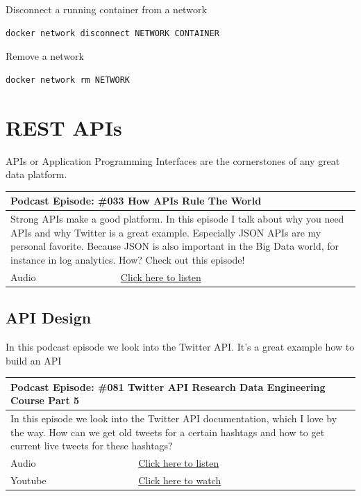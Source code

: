 \documentclass[12pt, numbers=noenddot]{scrreprt} %
\begin{document}
Disconnect a running container from a network
\begin{lstlisting}
docker network disconnect NETWORK CONTAINER
\end{lstlisting}

Remove  a network
\begin{lstlisting}
docker network rm NETWORK
\end{lstlisting}


\chapter{REST APIs}
APIs or Application Programming Interfaces are the cornerstones of any great data platform.

\begin{table}[h]
\begin{tabular}{ll}
\hline
\multicolumn{2}{l}{\textbf{Podcast Episode:} \#033 How APIs Rule The World} \\ \hline
\multicolumn{2}{p{15cm}}{Strong APIs make a good platform. In this episode I talk about why you need APIs and why Twitter is a great example. Especially JSON APIs are my personal favorite. Because JSON is also important in the Big Data world, for instance in log analytics. How? Check out this episode!}         \\ \hline
\multicolumn{1}{l|}{Audio}     & \href{https://anchor.fm/andreaskayy/episodes/How-APIs-Rule-The-World--PoDS-033-e24ttq}{Click here to listen}   \\ \hline
\end{tabular}
\end{table}

\section{API Design}
In this podcast episode we look into the Twitter API. It's a great example how to build an API

\begin{table}[h]
\begin{tabular}{ll}
\hline
\multicolumn{2}{l}{\textbf{Podcast Episode:} \#081 Twitter API Research Data Engineering Course Part 5} \\ \hline
\multicolumn{2}{p{15cm}}{In this episode we look into the Twitter API documentation, which I love by the way. How can we get old tweets for a certain hashtags and how to get current live tweets for these hashtags?}         \\ \hline
\multicolumn{1}{l|}{Audio}     & \href{https://anchor.fm/andreaskayy/episodes/081-How-to-get-tweets-from-the-Twitter-API-e45j32}{Click here to listen}   \\
\multicolumn{1}{l|}{Youtube}   & \href{https://youtu.be/UnAXKxeIlyg}{Click here to watch}   \\ \hline
\end{tabular}
\end{table}
\end{document}

